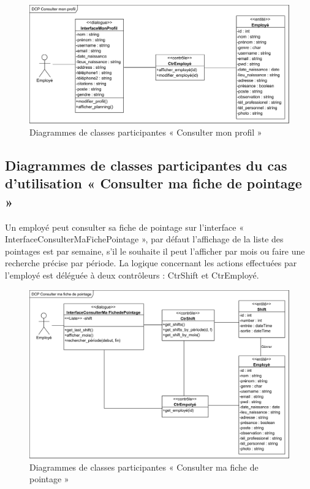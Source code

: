 \begin{itemize}
            \vspace{-20pt}
            \begin{figure}[h!]
                 \centering
                \includegraphics[scale=0.7]{images/DCP/DCP consulter_mon_profil.png}
                 \caption{Diagrammes de classes participantes « Consulter mon profil »}
                 \label{fig25}
            \end{figure}
        \vspace{-20pt}
        \subsection*{Diagrammes de classes participantes du cas d'utilisation « Consulter ma fiche de pointage »}
            Un employé peut consulter sa fiche de pointage sur l’interface « InterfaceConsulterMaFichePointage », par défaut l’affichage de la liste des pointages est par semaine, s’il le souhaite il peut l’afficher par mois ou faire une recherche précise par période. La logique concernant les actions effectuées par l’employé est déléguée à deux contrôleurs : CtrShift et CtrEmployé.
            
            \begin{figure}[h!]
                 \centering
                \includegraphics[scale=0.72]{images/DCP/DCP Consulter ma fiche de pointage.png}
                 \caption{Diagrammes de classes participantes « Consulter ma fiche de pointage »}
                 \label{fig26}
            \end{figure}
            

\end{itemize}
